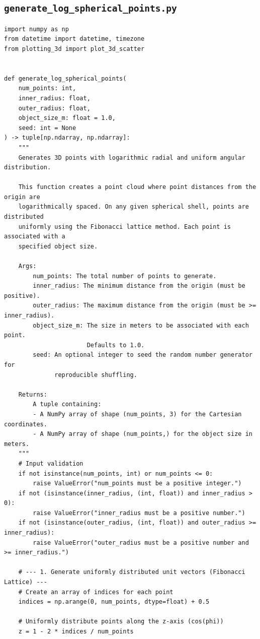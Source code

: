 \documentclass[11pt]{article}
\begin{document}
\subsection{\texttt{generate\_log\_spherical\_points.py}}
\begin{Verbatim}
import numpy as np
from datetime import datetime, timezone
from plotting_3d import plot_3d_scatter


def generate_log_spherical_points(
    num_points: int,
    inner_radius: float,
    outer_radius: float,
    object_size_m: float = 1.0,
    seed: int = None
) -> tuple[np.ndarray, np.ndarray]:
    """
    Generates 3D points with logarithmic radial and uniform angular distribution.

    This function creates a point cloud where point distances from the origin are
    logarithmically spaced. On any given spherical shell, points are distributed
    uniformly using the Fibonacci lattice method. Each point is associated with a
    specified object size.

    Args:
        num_points: The total number of points to generate.
        inner_radius: The minimum distance from the origin (must be positive).
        outer_radius: The maximum distance from the origin (must be >= inner_radius).
        object_size_m: The size in meters to be associated with each point.
                       Defaults to 1.0.
        seed: An optional integer to seed the random number generator for
              reproducible shuffling.

    Returns:
        A tuple containing:
        - A NumPy array of shape (num_points, 3) for the Cartesian coordinates.
        - A NumPy array of shape (num_points,) for the object size in meters.
    """
    # Input validation
    if not isinstance(num_points, int) or num_points <= 0:
        raise ValueError("num_points must be a positive integer.")
    if not (isinstance(inner_radius, (int, float)) and inner_radius > 0):
        raise ValueError("inner_radius must be a positive number.")
    if not (isinstance(outer_radius, (int, float)) and outer_radius >= inner_radius):
        raise ValueError("outer_radius must be a positive number and >= inner_radius.")

    # --- 1. Generate uniformly distributed unit vectors (Fibonacci Lattice) ---
    # Create an array of indices for each point
    indices = np.arange(0, num_points, dtype=float) + 0.5

    # Uniformly distribute points along the z-axis (cos(phi))
    z = 1 - 2 * indices / num_points


\end{Verbatim}
\end{document}
